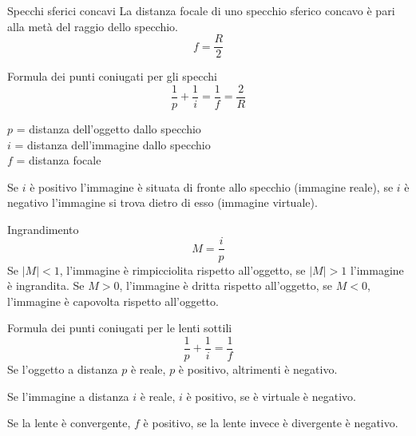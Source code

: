 \documentclass[a4paper,11pt,italian]{article}
\begin{document}
\begin{description}
\begin{soloscientifico} %
  \item[Specchi sferici concavi] 
  La distanza focale di uno specchio sferico concavo è pari alla metà del raggio dello specchio.
  \[ f = \frac{R}{2} \]
  
  \item[Formula dei punti coniugati per gli specchi]
  \[ \frac{1}{p} +\frac{1}{i} = \frac{1}{f} = \frac{2}{R} \]
  \begin{multicols}{2}
  $ p $ = distanza dell'oggetto dallo specchio\\
  $ i $ = distanza dell'immagine dallo specchio\\
  $ f $ = distanza focale
  \end{multicols}
  Se $ i $ è positivo l'immagine è situata di fronte allo specchio (immagine reale), se $ i $ è negativo l'immagine si trova dietro di esso (immagine virtuale).
  
  \item[Ingrandimento]
  \[ M = \frac{i}{p} \]
  Se $ |M| < 1$, l'immagine è rimpicciolita rispetto all'oggetto, se $ |M| >1 $ l'immagine è ingrandita. Se $ M > 0 $, l'immagine è dritta rispetto all'oggetto, se $ M<0 $, l'immagine è capovolta rispetto all'oggetto.
  
  \item[Formula dei punti coniugati per le lenti sottili]
  \[ \frac{1}{p} +\frac{1}{i} = \frac{1}{f} \]
  Se l'oggetto a distanza $ p $ è reale, $ p $ è positivo, altrimenti è negativo.
  
  Se l'immagine a distanza $ i $ è reale, $ i $ è positivo, se è virtuale è negativo.
  
  Se la lente è convergente, $ f $ è positivo, se la lente invece è divergente è negativo.

%   
\end{soloscientifico}   %


\end{description}
\end{document}
